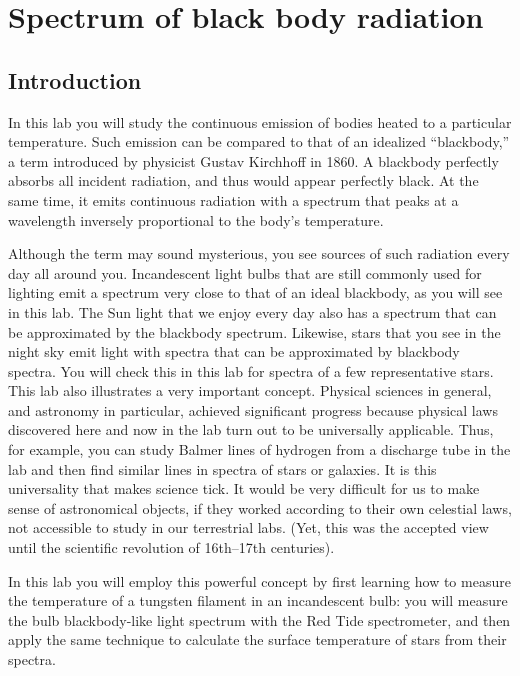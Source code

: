 \newlength{\taskspace}
\setlength{\taskspace}{-.2in}

\chapter{Spectrum of black body radiation}

\section{Introduction}

In this lab you will study the continuous emission of bodies heated to a particular temperature. Such emission can be compared to that of an idealized ``blackbody,'' a term introduced by physicist Gustav Kirchhoff in 1860. A blackbody perfectly absorbs all incident radiation, and thus would appear perfectly black. At the same time, it emits continuous radiation with a spectrum that peaks at a wavelength inversely proportional to the body's temperature.

Although the term may sound mysterious, you see sources of such radiation every day all around you. Incandescent light bulbs that are still commonly used for lighting emit a spectrum very close to that of an ideal blackbody, as you will see in this lab. The Sun light that we enjoy every day also has a spectrum that can be approximated by the blackbody spectrum. Likewise, stars that you see in the night sky emit light with spectra that can be approximated by blackbody spectra. You will check this in this lab for spectra of a few representative stars. This lab also illustrates a very important concept. Physical sciences in general, and astronomy in particular, achieved significant progress because physical laws discovered here and now in the lab turn out to be universally applicable. Thus, for example, you can study Balmer lines of hydrogen from a discharge tube in the lab and then find similar lines in spectra of stars or galaxies. It is this universality that makes science tick. It would be very difficult for us to make sense of astronomical objects, if they worked according to their own
celestial laws, not accessible to study in our terrestrial labs. (Yet, this was the accepted view until the scientific revolution of 16th--17th centuries).

In this lab you will employ this powerful concept by first learning how to measure the temperature of a tungsten filament in an incandescent bulb: you will measure the bulb blackbody-like light spectrum with the Red Tide spectrometer, and then apply the same technique to calculate the surface temperature of stars from their spectra.

